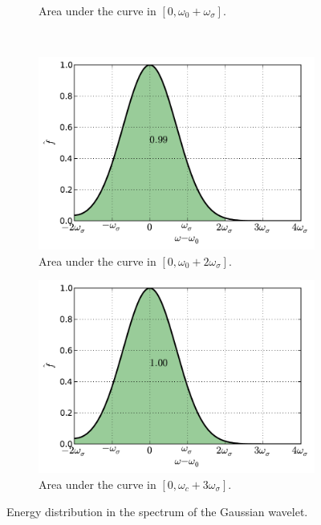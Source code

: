 \documentclass[12pt,letterpaper]{article}
\begin{document}
{\begin{figure}[h]
\begin{subfigure}[b]{0.45\textwidth}
        \caption{Area under the curve in $[0,\omega_0 + \omega_\sigma]$.}
    \end{subfigure}\\
    \begin{subfigure}[b]{0.45\textwidth}
        \includegraphics[width=\textwidth]{img/gaussian_area=3.pdf}
        \caption{Area under the curve in $[0,\omega_0 + 2\omega_\sigma]$.}
    \end{subfigure}
    \begin{subfigure}[b]{0.45\textwidth}
        \includegraphics[width=\textwidth]{img/gaussian_area=4.pdf}
        \caption{Area under the curve in $[0,\omega_c + 3\omega_\sigma]$.}
    \end{subfigure}
    \caption{Energy distribution in the spectrum of the Gaussian wavelet.}
    \label{fig:gaussian-areas}
\end{figure}

}
\end{document}
